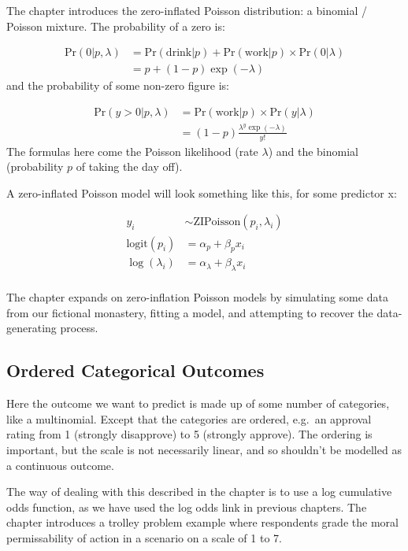 \documentclass[
]{book}
\begin{document}
The chapter introduces the zero-inflated Poisson distribution: a binomial / Poisson mixture. The probability of a zero is:

\[
\begin{aligned}
\text{Pr}(0|p,\lambda) & = \text{Pr}(\text{drink}|p) + \text{Pr}(\text{work}|p) \times \text{Pr}(0|\lambda) \\
&= p + (1-p)\exp(-\lambda)
\end{aligned}
\]
and the probability of some non-zero figure is:

\[
\begin{aligned}
\text{Pr}(y > 0|p,\lambda) & = \text{Pr}(\text{work}|p) \times \text{Pr}(y|\lambda) \\
&= (1-p)\frac{\lambda^y \exp(-\lambda)}{y!}
\end{aligned}
\]
The formulas here come the Poisson likelihood (rate \(\lambda\)) and the binomial (probability \(p\) of taking the day off).

A zero-inflated Poisson model will look something like this, for some predictor x:

\[
\begin{aligned}
y_i & \sim \text{ZIPoisson}(p_i,\lambda_i) \\
\text{logit}(p_i)&= \alpha_p + \beta_p x_i\\
\log(\lambda_i)&= \alpha_\lambda + \beta_\lambda x_i\\
\end{aligned}
\]

The chapter expands on zero-inflation Poisson models by simulating some data from our fictional monastery, fitting a model, and attempting to recover the data-generating process.

\hypertarget{ordered-categorical-outcomes}{%
\subsection*{Ordered Categorical Outcomes}\label{ordered-categorical-outcomes}}

Here the outcome we want to predict is made up of some number of categories, like a multinomial. Except that the categories are ordered, e.g.~an approval rating from 1 (strongly disapprove) to 5 (strongly approve). The ordering is important, but the scale is not necessarily linear, and so shouldn't be modelled as a continuous outcome.

The way of dealing with this described in the chapter is to use a log cumulative odds function, as we have used the log odds link in previous chapters. The chapter introduces a trolley problem example where respondents grade the moral permissability of action in a scenario on a scale of 1 to 7.
\end{document}
